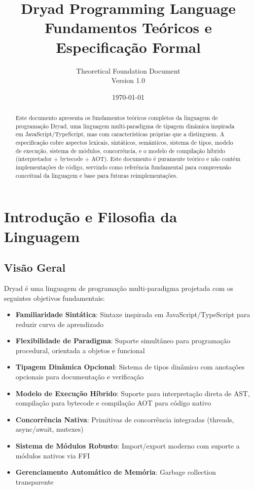 \documentclass[12pt,a4paper]{article}
\title{\textbf{Dryad Programming Language} \\ 
\Large Fundamentos Teóricos e Especificação Formal}
\author{Theoretical Foundation Document \\ Version 1.0}
\date{\today}
\theoremstyle{definition}
\begin{document}
\maketitle
\newpage

\tableofcontents
\newpage

\begin{abstract}
Este documento apresenta os fundamentos teóricos completos da linguagem de programação Dryad, uma linguagem multi-paradigma de tipagem dinâmica inspirada em JavaScript/TypeScript, mas com características próprias que a distinguem. A especificação cobre aspectos lexicais, sintáticos, semânticos, sistema de tipos, modelo de execução, sistema de módulos, concorrência, e o modelo de compilação híbrido (interpretador + bytecode + AOT). Este documento é puramente teórico e não contém implementações de código, servindo como referência fundamental para compreensão conceitual da linguagem e base para futuras reimplementações.
\end{abstract}

\section{Introdução e Filosofia da Linguagem}

\subsection{Visão Geral}

Dryad é uma linguagem de programação multi-paradigma projetada com os seguintes objetivos fundamentais:

\begin{itemize}
    \item \textbf{Familiaridade Sintática}: Sintaxe inspirada em JavaScript/TypeScript para reduzir curva de aprendizado
    \item \textbf{Flexibilidade de Paradigma}: Suporte simultâneo para programação procedural, orientada a objetos e funcional
    \item \textbf{Tipagem Dinâmica Opcional}: Sistema de tipos dinâmico com anotações opcionais para documentação e verificação
    \item \textbf{Modelo de Execução Híbrido}: Suporte para interpretação direta de AST, compilação para bytecode e compilação AOT para código nativo
    \item \textbf{Concorrência Nativa}: Primitivas de concorrência integradas (threads, async/await, mutexes)
    \item \textbf{Sistema de Módulos Robusto}: Import/export moderno com suporte a módulos nativos via FFI
    \item \textbf{Gerenciamento Automático de Memória}: Garbage collection transparente
\end{itemize}
\end{document}
